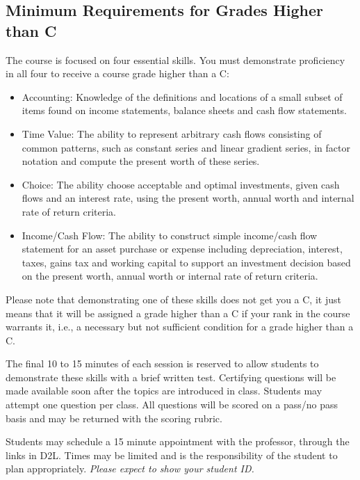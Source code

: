 \documentclass[letterpaper,10pt]{article}
\begin{document}
\subsection{Minimum Requirements for Grades Higher than C}

The course is focused on four essential skills. You must
demonstrate proficiency in all four to receive a course grade higher than a C:

\begin{itemize}

\item Accounting: Knowledge of the definitions and locations of a
  small subset of items found on income statements, balance sheets and
  cash flow statements.

\item Time Value: The ability to represent arbitrary cash flows
  consisting of common patterns, such as constant series and linear
  gradient series, in factor notation and compute the present worth of
  these series.

\item Choice: The ability choose acceptable and optimal investments,
  given cash flows and an interest rate, using the present worth,
  annual worth and internal rate of return criteria.

\item Income/Cash Flow: The ability to construct simple income/cash
  flow statement for an asset purchase or expense including
  depreciation, interest, taxes, gains tax and working capital to
  support an investment decision based on the present worth, annual
  worth or internal rate of return criteria.
\end{itemize}

Please note that demonstrating one of these skills does not get you a
C, it just means that it will be assigned a grade higher than a C if
your rank in the course warrants it, i.e., a necessary but not sufficient condition for a grade higher than a C.

The final 10 to 15 minutes of each session is reserved to allow
students to demonstrate these skills with a brief written test.
Certifying questions will be made available soon after the topics are introduced in class. Students may attempt one question per class.  All questions
will be scored on a pass/no pass basis and may be returned with the
scoring rubric.  

Students may schedule a 15 minute appointment with the professor, through the links
in D2L.   Times may be limited
and is the responsibility of the student to plan appropriately.
\emph{Please expect to show your student ID.}
\end{document}
